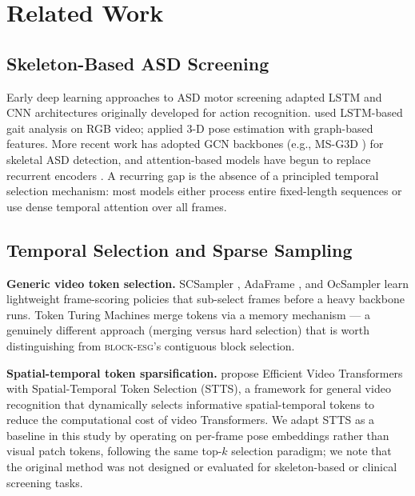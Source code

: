 \documentclass[a4paper,fleqn]{cas-sc}
\newcommand{\besg}{\textsc{block-esg}\xspace}
\begin{document}
\section{Related Work}
\label{sec:related}

\subsection{Skeleton-Based ASD Screening}

Early deep learning approaches to ASD motor screening adapted LSTM and CNN
architectures originally developed for action recognition.
\citet{anzalone2019automatic} used LSTM-based gait analysis on RGB video;
\citet{raj2021autism} applied 3-D pose estimation with graph-based features.
More recent work has adopted GCN backbones (e.g., MS-G3D \citep{liu2020disentangling})
for skeletal ASD detection, and attention-based models have begun to replace
recurrent encoders \citep{pediaditis2022video}.
A recurring gap is the absence of a principled temporal selection mechanism:
most models either process entire fixed-length sequences or use dense temporal
attention over all frames.


\subsection{Temporal Selection and Sparse Sampling}

\textbf{Generic video token selection.}
SCSampler \citep{korbar2019scsampler}, AdaFrame \citep{wu2019adaframe}, and
OcSampler \citep{lin2022ocsampler} learn lightweight frame-scoring policies
that sub-select frames before a heavy backbone runs.
Token Turing Machines \citep{ryoo2023token} merge tokens via a memory
mechanism --- a genuinely different approach (merging versus hard selection)
that is worth distinguishing from \besg's contiguous block selection.

\textbf{Spatial-temporal token sparsification.}
\citet{wang2022stts} propose Efficient Video Transformers with Spatial-Temporal
Token Selection (STTS), a framework for general video recognition that
dynamically selects informative spatial-temporal tokens to reduce the
computational cost of video Transformers.
We adapt STTS as a baseline in this study by operating on per-frame pose
embeddings rather than visual patch tokens, following the same top-$k$
selection paradigm; we note that the original method was not designed or
evaluated for skeleton-based or clinical screening tasks.
\end{document}
